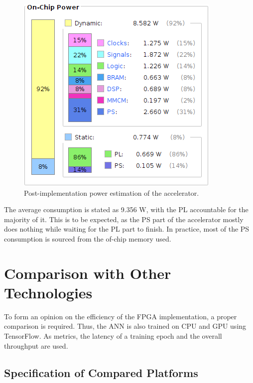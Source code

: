 \begin{figure}[H]
    \centering
        \includegraphics{Images/power.png}
        \decoRule
        \caption[Power Estimation]{Post-implementation power estimation of the accelerator.}
        \label{fig: power}
\end{figure}

The average consumption is stated as 9.356 W, with the PL accountable for the majority of it. This is to be expected, as the PS part of the accelerator mostly does nothing while waiting for the PL part to finish. In practice, most of the PS consumption is sourced from the of-chip memory used.

\section{Comparison with Other Technologies}
To form an opinion on the efficiency of the FPGA implementation, a proper comparison is required. Thus, the ANN is also trained on CPU and GPU using TensorFlow. As metrics, the latency of a training epoch and the overall throughput are used.

\subsection{Specification of Compared Platforms}
